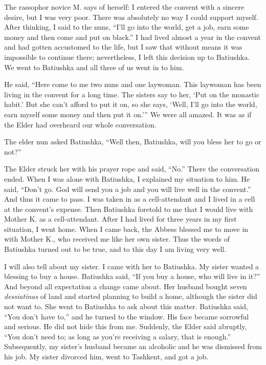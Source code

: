 \begin{longquote}{The rassophor novice M. says of herself:}
I entered the convent with a sincere desire, but I was very poor. There was absolutely no way I could support myself. After thinking, I said to the nuns, ``I'll go into the world, get a job, earn some money and then come and put on black.'' I had lived almost a year in the convent and had gotten accustomed to the life, but I saw that without means it was impossible to continue there; nevertheless, I left this decision up to Batiushka. We went to Batiushka and all three of us went in to him.

He said, ``Here come to me two nuns and one laywoman. This laywoman has been living in the convent for a long time. The sisters say to her, `Put on the monastic habit.' But she can't afford to put it on, so she says, `Well, I'll go into the world, earn myself some money and then put it on.''' We were all amazed. It was as if the Elder had overheard our whole conversation.

The elder nun asked Batiushka, ``Well then, Batiushka, will you bless her to go or not?''

The Elder struck her with his prayer rope and said, ``No.'' There the conversation ended. When I was alone with Batiushka, I explained my situation to him. He said, ``Don't go. God will send you a job and you will live well in the convent.'' And thus it came to pass. I was taken in as a cell-attendant and I lived in a cell at the convent's expense. Then Batiushka foretold to me that I would live with Mother K. as a cell-attendant. After I had lived for three years in my first situation, I went home. When I came back, the Abbess blessed me to move in with Mother K., who received me like her own sister. Thus the words of Batiushka turned out to be true, and to this day I am living very well.

I will also tell about my sister. I came with her to Batiushka. My sister wanted a blessing to buy a house. Batiushka said, ``If you buy a house, who will live in it?'' And beyond all expectation a change came about. Her husband bought seven \textit{dessiatinas} of land and started planning to build a home, although the sister did not want to. She went to Batiushka to ask about this matter. Batiushka said, ``You don't have to,'' and he turned to the window. His face became sorrowful and serious. He did not hide this from me. Suddenly, the Elder said abruptly, ``You don't need to; as long as you're receiving a salary, that is enough.'' Subsequently, my sister's husband became an alcoholic and he was dismissed from his job. My sister divorced him, went to Tashkent, and got a job.
\end{longquote}

